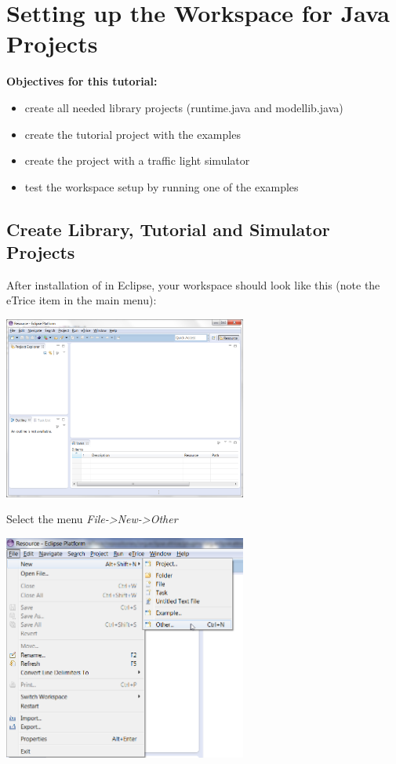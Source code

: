 \section{Setting up the Workspace for Java Projects}

\textbf{Objectives for this tutorial:}
\begin{itemize}
	\item create all needed library projects (runtime.java and modellib.java)
	\item create the tutorial project with the examples
	\item create the project with a traffic light simulator
	\item test the workspace setup by running one of the examples
\end{itemize}

\subsection{Create Library, Tutorial and Simulator Projects}

After installation of \eTrice{} in Eclipse, your workspace should look like this (note the eTrice item in the main menu):  

\includegraphics[width=0.6\textwidth]{images/013-SetupWorkspace01.png}

Select the menu \emph{File->New->Other}

\includegraphics[width=0.6\textwidth]{images/013-SetupWorkspace02.png}

